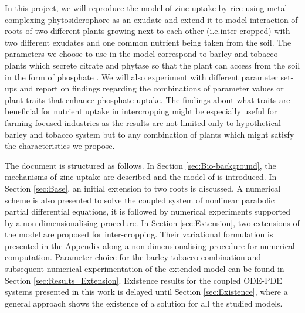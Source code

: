 \documentclass[11pt]{article}
\numberwithin{equation}{section}
\begin{document}
In this project, we will reproduce the model of zinc uptake by rice using metal-complexing phytosidero\-phore as an exudate \cite{Ptashnyk-2011} and extend it to model interaction of roots of two different plants growing next to each other (i.e.inter-cropped) with two different exudates and one common nutrient being taken from the soil. The parameters we choose to use in the model correspond to barley and tobacco plants which secrete citrate and phytase so that the plant can access  from the soil in the form of phosphate \cite{giles_richardson2018}. We will also experiment with different parameter set-ups and report on findings regarding the combinations of parameter values or plant traits that enhance phosphate uptake. The findings about what traits are beneficial for nutrient uptake in intercropping might be especially useful for farming focused industries as the results are not limited only to hypothetical barley and tobacco system but to any combination of plants which might satisfy the characteristics we propose. 

The document is structured as follows. In Section \ref{sec:Bio-background}, the mechanisms of zinc uptake are described and the model of \cite{Ptashnyk-2011} is introduced. 
In Section \ref{sec:Base}, an initial extension to two roots is discussed. A numerical scheme is also presented to solve the coupled system of nonlinear parabolic partial differential equations, it is followed by numerical experiments supported by a non-dimensionalising procedure. In Section \ref{sec:Extension}, two extensions of the model are proposed for inter-cropping. Their variational formulation is presented in the Appendix along a non-dimensionalising procedure for numerical computation. Parameter choice for the barley-tobacco combination and subsequent numerical experimentation of the extended model can be found in Section \ref{sec:Results_Extension}. Existence results for the coupled ODE-PDE systems presented in this work is delayed until Section \ref{sec:Existence}, where a general approach shows the existence of a solution for all the studied models.
\end{document}
